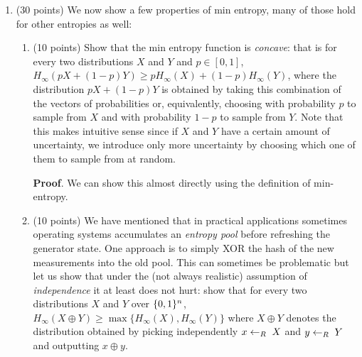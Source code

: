 \documentclass{article}
\begin{document}
\begin{enumerate}[,start=6]%

\item{}
(30 points) We now show a few properties of min entropy, many of those hold for other entropies as well:%

\begin{enumerate}[noitemsep,topsep=\mdcompacttopsep,label=\alph*.]%

\item{}(10 points) Show that the min entropy function is \emph{concave}: that is for every two distributions $X$ and $Y$ and $p\in [0,1]$, $H_{\infty}(pX+(1-p)Y)\geq pH_{\infty}(X)+(1-p)H_{\infty}(Y)$, where the distribution $pX+(1-p)Y$ is obtained by taking this combination of the vectors of probabilities or, equivalently, choosing with probability $p$ to sample from $X$ and with probability $1-p$ to sample from $Y$. Note that this makes intuitive sense since if $X$ and $Y$ have a certain amount of uncertainty, we introduce only more uncertainty by choosing which one of them to sample from at random.

\begin{mdbmarginx}{1ex}{0pt}{1ex}{0pt}%
\noindent{}\textbf{Proof}.  We can show this almost directly using the definition of min-entropy.%
\end{mdbmarginx}%

\item{}(10 points) We have mentioned that in practical applications sometimes  operating systems accumulates an \emph{entropy pool} before refreshing the generator state. One approach is to simply XOR the hash of the new measurements into the old pool.
This can sometimes be problematic but let us show that under the (not always realistic) assumption of \emph{independence} it at least does not hurt: show that for every two distributions $X$ and $Y$ over $\{0,1\}^n$, $H_{\infty}(X \oplus Y) \geq \max \{ H_{\infty}(X) , H_{\infty}(Y) \}$ where $X\oplus Y$ denotes the distribution obtained by picking independently $x\leftarrow_R\; X$ and $y\leftarrow_R\; Y$ and outputting $x\oplus y$.


\end{enumerate}
\end{enumerate}
\end{document}
